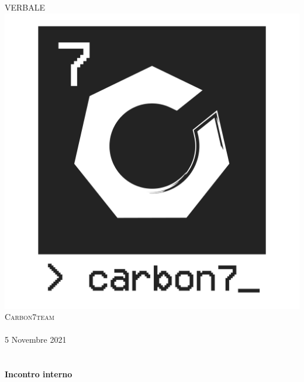 \begin{center}
    \textsc{\huge VERBALE}\\[0.75cm] 
    \includegraphics[scale=0.25]{res/images/carbon7_small_logo-07.png}\\[1cm]
    \textsc{\Large Carbon7team}\\[0.3cm]
    \\[0.5cm]
    {\large 5 Novembre 2021}\\[0.5cm]
    \\[0.5cm]

    \HRule \\[0.4cm]
    {\huge \bfseries Incontro interno}\\[0.2cm]
    \HRule \\[1.5cm]


\end{center}
